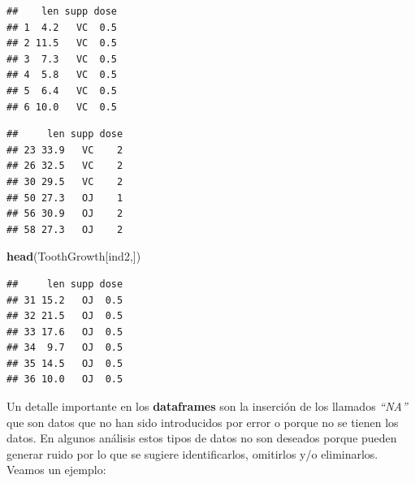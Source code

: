 \documentclass[
]{book}
\newenvironment{Shaded}{\begin{snugshade}}{\end{snugshade}}
\newcommand{\DecValTok}[1]{\textcolor[rgb]{0.00,0.00,0.81}{#1}}
\newcommand{\FunctionTok}[1]{\textcolor[rgb]{0.13,0.29,0.53}{\textbf{#1}}}
\newcommand{\NormalTok}[1]{#1}
\newcommand{\OtherTok}[1]{\textcolor[rgb]{0.56,0.35,0.01}{#1}}
\newcommand{\SpecialCharTok}[1]{\textcolor[rgb]{0.81,0.36,0.00}{\textbf{#1}}}
\newcommand{\StringTok}[1]{\textcolor[rgb]{0.31,0.60,0.02}{#1}}
\begin{document}
\begin{Shaded}
\end{Shaded}

\begin{verbatim}
##    len supp dose
## 1  4.2   VC  0.5
## 2 11.5   VC  0.5
## 3  7.3   VC  0.5
## 4  5.8   VC  0.5
## 5  6.4   VC  0.5
## 6 10.0   VC  0.5
\end{verbatim}

\begin{Shaded}
\end{Shaded}

\begin{verbatim}
##     len supp dose
## 23 33.9   VC    2
## 26 32.5   VC    2
## 30 29.5   VC    2
## 50 27.3   OJ    1
## 56 30.9   OJ    2
## 58 27.3   OJ    2
\end{verbatim}

\begin{Shaded}
\begin{Highlighting}[]
\FunctionTok{head}\NormalTok{(ToothGrowth[ind2,])}
\end{Highlighting}
\end{Shaded}

\begin{verbatim}
##     len supp dose
## 31 15.2   OJ  0.5
## 32 21.5   OJ  0.5
## 33 17.6   OJ  0.5
## 34  9.7   OJ  0.5
## 35 14.5   OJ  0.5
## 36 10.0   OJ  0.5
\end{verbatim}

Un detalle importante en los \textbf{dataframes} son la inserción de los llamados \emph{``NA''} que son datos que no han sido introducidos por error o porque no se tienen los datos.
En algunos análisis estos tipos de datos no son deseados porque pueden generar ruido por lo que se sugiere identificarlos, omitirlos y/o eliminarlos.
Veamos un ejemplo:
\end{document}
